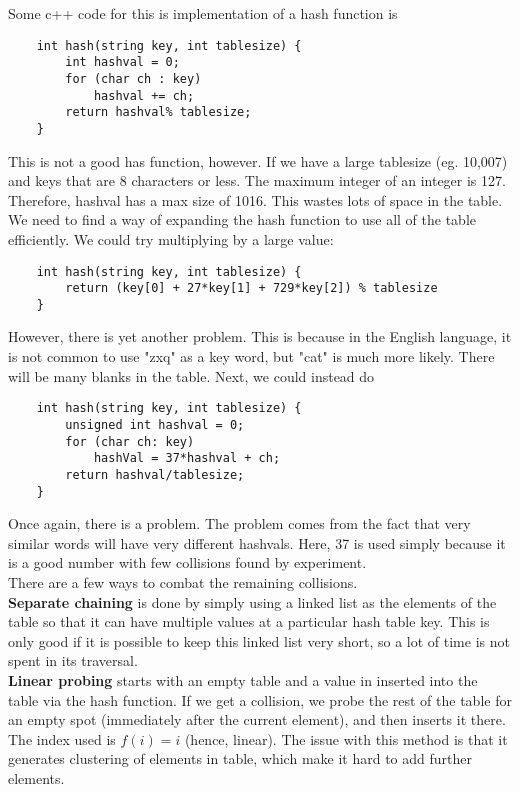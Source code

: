 \documentclass[]{article}
\begin{document}
Some c++ code for this is implementation of a hash function is

\begin{lstlisting}
	int hash(string key, int tablesize) {
		int hashval = 0;
		for (char ch : key)
			hashval += ch;
		return hashval% tablesize;
	}
\end{lstlisting}\bigbreak

This is not a good has function, however. If we have a large tablesize (eg. 10,007) and keys that are 8 characters or less. The maximum integer of an integer is 127. Therefore, hashval has a max size of 1016. This wastes lots of space in the table. We need to find a way of expanding the hash function to use all of the table efficiently. We could try multiplying by a large value:

\begin{lstlisting}
	int hash(string key, int tablesize) {
		return (key[0] + 27*key[1] + 729*key[2]) % tablesize
	}
\end{lstlisting}\bigbreak

However, there is yet another problem. This is because in the English language, it is not common to use "zxq" as a key word, but "cat" is much more likely. There will be many blanks in the table. Next, we could instead do

\begin{lstlisting}
	int hash(string key, int tablesize) {
		unsigned int hashval = 0;
		for (char ch: key) 
			hashVal = 37*hashval + ch;
		return hashval/tablesize;
	}
\end{lstlisting}\bigbreak

Once again, there is a problem. The problem comes from the fact that very similar words will have very different hashvals. Here, 37 is used simply because it is a good number with few collisions found by experiment.\\

There are a few ways to combat the remaining collisions.\\

\textbf{Separate chaining} is done by simply using a linked list as the elements of the table so that it can have multiple values at a particular hash table key. This is only good if it is possible to keep this linked list very short, so a lot of time is not spent in its traversal.\\

\textbf{Linear probing} starts with an empty table and a value in inserted into the table via the hash function. If we get a collision, we probe the rest of the table for an empty spot (immediately after the current element), and then inserts it there. The index used is $f(i) = i$ (hence, linear).  The issue with this method is that it generates clustering of elements in table, which make it hard to add further elements. \\
\end{document}
